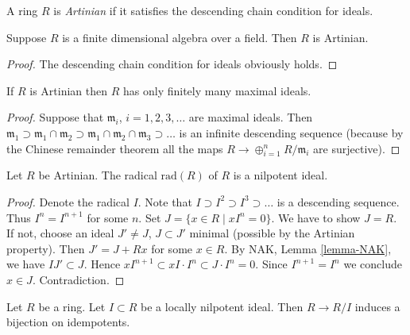 \begin{definition}
\label{definition-artinian}
A ring $R$ is {\it Artinian} if it satisfies the
descending chain condition for ideals.
\end{definition}

\begin{lemma}
\label{lemma-finite-dimensional-algebra}
Suppose $R$ is a finite dimensional algebra over a field.
Then $R$ is Artinian.
\end{lemma}

\begin{proof}
The descending chain condition for ideals obviously holds.
\end{proof}

\begin{lemma}
\label{lemma-artinian-finite-nr-max}
If $R$ is Artinian then $R$ has only finitely many maximal ideals.
\end{lemma}

\begin{proof}
Suppose that $\mathfrak m_i$, $i = 1, 2, 3, \ldots$ are maximal ideals.
Then $\mathfrak m_1 \supset \mathfrak m_1\cap \mathfrak m_2
\supset \mathfrak m_1 \cap \mathfrak m_2 \cap \mathfrak m_3 \supset \ldots$
is an infinite descending sequence (because by the Chinese
remainder theorem all the maps $R \to \oplus_{i = 1}^n R/\mathfrak m_i$
are surjective).
\end{proof}

\begin{lemma}
\label{lemma-artinian-radical-nilpotent}
Let $R$ be Artinian. The radical $\text{rad}(R)$ of $R$ is
a nilpotent ideal.
\end{lemma}

\begin{proof}
Denote the radical $I$.
Note that $I \supset I^2 \supset I^3 \supset \ldots$ is a descending
sequence. Thus $I^n = I^{n + 1}$ for some $n$.
Set $J = \{ x\in R \mid xI^n = 0\}$. We have to show $J = R$.
If not, choose an ideal $J' \not= J$, $J \subset J'$ minimal (possible
by the Artinian property). Then $J' = J + Rx$ for some $x \in R$.
By NAK, Lemma \ref{lemma-NAK}, we have $IJ' \subset J$.
Hence $xI^{n + 1} \subset xI \cdot I^n \subset J \cdot I^n = 0$.
Since $I^{n + 1} = I^n$ we conclude $x\in J$. Contradiction.
\end{proof}

\begin{lemma}
\label{lemma-lift-idempotents}
Let $R$ be a ring. Let $I \subset R$ be a locally nilpotent ideal.
Then $R \to R/I$ induces a bijection on idempotents.
\end{lemma}

